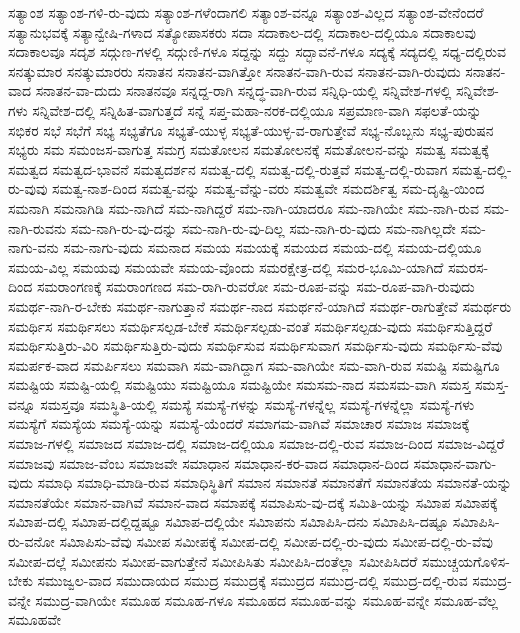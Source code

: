 {ಸತ್ಯಾಂಶ
ಸತ್ಯಾಂಶ-ಗಳಿ-ರು-ವುದು
ಸತ್ಯಾಂಶ-ಗಳೆಂದಾಗಲಿ
ಸತ್ಯಾಂಶ-ವನ್ನೂ
ಸತ್ಯಾಂಶ-ವಿಲ್ಲದ
ಸತ್ಯಾಂಶ-ವೇನೆಂದರೆ
ಸತ್ಯಾನುಭವಕ್ಕೆ
ಸತ್ಯಾನ್ವೇಷಿ-ಗಳಾದ
ಸತ್ಯೋಪಾಸಕರು
ಸದಾ
ಸದಾಕಾಲ-ದಲ್ಲಿ
ಸದಾಕಾಲ-ದಲ್ಲಿಯೂ
ಸದಾಕಾಲವು
ಸದಾಕಾಲವೂ
ಸದೃಶ
ಸದ್ಗುಣ-ಗಳಲ್ಲಿ
ಸದ್ಗುಣಿ-ಗಳೂ
ಸದ್ದನ್ನು
ಸದ್ದು
ಸದ್ಭಾವನೆ-ಗಳೂ
ಸದ್ಯಕ್ಕೆ
ಸದ್ಯದಲ್ಲಿ
ಸಧ್ಯ-ದಲ್ಲಿರುವ
ಸನತ್ಕುಮಾರ
ಸನತ್ಕುಮಾರರು
ಸನಾತನ
ಸನಾತನ-ವಾಗಿತ್ತೋ
ಸನಾತನ-ವಾಗಿ-ರುವ
ಸನಾತನ-ವಾಗಿ-ರುವುದು
ಸನಾತನ-ವಾದ
ಸನಾತನ-ವಾ-ದುದು
ಸನಾತನವೂ
ಸನ್ನದ್ದ-ರಾಗಿ
ಸನ್ನದ್ಧ-ವಾಗಿ-ರುವ
ಸನ್ನಿಧಿ-ಯಲ್ಲಿ
ಸನ್ನಿವೇಶ-ಗಳಲ್ಲಿ
ಸನ್ನಿವೇಶ-ಗಳು
ಸನ್ನಿವೇಶ-ದಲ್ಲಿ
ಸನ್ನಿಹಿತ-ವಾಗುತ್ತದೆ
ಸನ್ನೆ
ಸಪ್ತ-ಮಹಾ-ನರಕ-ದಲ್ಲಿಯೂ
ಸಪ್ರಮಾಣ-ವಾಗಿ
ಸಫಲತೆ-ಯನ್ನು
ಸಭಿಕರ
ಸಭೆ
ಸಭೆಗೆ
ಸಭ್ಯ
ಸಭ್ಯತೆಗೂ
ಸಭ್ಯತೆ-ಯುಳ್ಳ
ಸಭ್ಯತೆ-ಯುಳ್ಳ-ವ-ರಾಗುತ್ತೇವೆ
ಸಭ್ಯ-ನೊಬ್ಬನು
ಸಭ್ಯ-ಪುರುಷನ
ಸಭ್ಯರು
ಸಮ
ಸಮಂಜಸ-ವಾಗುತ್ತ
ಸಮಗ್ರ
ಸಮತೋಲನ
ಸಮತೋಲನಕ್ಕೆ
ಸಮತೋಲನ-ವನ್ನು
ಸಮತ್ವ
ಸಮತ್ವಕ್ಕೆ
ಸಮತ್ವದ
ಸಮತ್ವದ-ಭಾವನೆ
ಸಮತ್ವದರ್ಶನ
ಸಮತ್ವ-ದಲ್ಲಿ
ಸಮತ್ವ-ದಲ್ಲಿ-ರುತ್ತವೆ
ಸಮತ್ವ-ದಲ್ಲಿ-ರುವಾಗ
ಸಮತ್ವ-ದಲ್ಲಿ-ರು-ವುವು
ಸಮತ್ವ-ನಾಶ-ದಿಂದ
ಸಮತ್ವ-ವನ್ನು
ಸಮತ್ವ-ವೆನ್ನು-ವರು
ಸಮತ್ವವೇ
ಸಮದರ್ಶಿತ್ವ
ಸಮ-ದೃಷ್ಟಿ-ಯಿಂದ
ಸಮನಾಗಿ
ಸಮನಾಗಿಡಿ
ಸಮ-ನಾಗಿದೆ
ಸಮ-ನಾಗಿದ್ದರೆ
ಸಮ-ನಾಗಿ-ಯಾದರೂ
ಸಮ-ನಾಗಿಯೇ
ಸಮ-ನಾಗಿ-ರುವ
ಸಮ-ನಾಗಿ-ರುವನು
ಸಮ-ನಾಗಿ-ರು-ವು-ದನ್ನು
ಸಮ-ನಾಗಿ-ರು-ವು-ದಿಲ್ಲ
ಸಮ-ನಾಗಿ-ರು-ವುದು
ಸಮ-ನಾಗಿಲ್ಲದೇ
ಸಮ-ನಾಗು-ವನು
ಸಮ-ನಾಗು-ವುದು
ಸಮನಾದ
ಸಮಯ
ಸಮಯಕ್ಕೆ
ಸಮಯದ
ಸಮಯ-ದಲ್ಲಿ
ಸಮಯ-ದಲ್ಲಿಯೂ
ಸಮಯ-ವಿಲ್ಲ
ಸಮಯವು
ಸಮಯವೇ
ಸಮಯ-ವೊಂದು
ಸಮರಕ್ಷೇತ್ರ-ದಲ್ಲಿ
ಸಮರ-ಭೂಮಿ-ಯಾಗಿದೆ
ಸಮರಸ-ದಿಂದ
ಸಮರಾಂಗಣಕ್ಕೆ
ಸಮರಾಂಗಣದ
ಸಮ-ರಾಗಿ-ರುವರೋ
ಸಮ-ರೂಪ-ವನ್ನು
ಸಮ-ರೂಪ-ವಾಗಿ-ರುವುದು
ಸಮರ್ಥ-ನಾಗಿ-ರ-ಬೇಕು
ಸಮರ್ಥ-ನಾಗುತ್ತಾನೆ
ಸಮರ್ಥ-ನಾದ
ಸಮರ್ಥನೆ-ಯಾಗಿದೆ
ಸಮರ್ಥ-ರಾಗುತ್ತೇವೆ
ಸಮರ್ಥರು
ಸಮರ್ಥಿಸ
ಸಮರ್ಥಿಸಲು
ಸಮರ್ಥಿಸಲ್ಪಡ-ಬೇಕೆ
ಸಮರ್ಥಿಸಲ್ಪಡು-ವಂತೆ
ಸಮರ್ಥಿಸಲ್ಪಡು-ವುದು
ಸಮರ್ಥಿಸುತ್ತಿದ್ದರೆ
ಸಮರ್ಥಿಸುತ್ತಿರು-ವಿರಿ
ಸಮರ್ಥಿಸುತ್ತಿರು-ವುದು
ಸಮರ್ಥಿಸುವ
ಸಮರ್ಥಿಸುವಾಗ
ಸಮರ್ಥಿಸು-ವುದು
ಸಮರ್ಥಿಸು-ವೆವು
ಸಮರ್ಪಕ-ವಾದ
ಸಮರ್ಪಿಸಲು
ಸಮವಾಗಿ
ಸಮ-ವಾಗಿದ್ದಾಗ
ಸಮ-ವಾಗಿಯೇ
ಸಮ-ವಾಗಿ-ರುವ
ಸಮಷ್ಟಿ
ಸಮಷ್ಟಿಗೂ
ಸಮಷ್ಟಿಯ
ಸಮಷ್ಟಿ-ಯಲ್ಲಿ
ಸಮಷ್ಟಿಯು
ಸಮಷ್ಟಿಯೂ
ಸಮಷ್ಟಿಯೇ
ಸಮಸಮ-ನಾದ
ಸಮಸಮ-ವಾಗಿ
ಸಮಸ್ತ
ಸಮಸ್ತ-ವನ್ನೂ
ಸಮಸ್ತವೂ
ಸಮಸ್ಥಿತಿ-ಯಲ್ಲಿ
ಸಮಸ್ಯೆ
ಸಮಸ್ಯೆ-ಗಳನ್ನು
ಸಮಸ್ಯೆ-ಗಳನ್ನೆಲ್ಲ
ಸಮಸ್ಯೆ-ಗಳನ್ನೆಲ್ಲಾ
ಸಮಸ್ಯೆ-ಗಳು
ಸಮಸ್ಯೆಗೆ
ಸಮಸ್ಯೆಯ
ಸಮಸ್ಯೆ-ಯನ್ನು
ಸಮಸ್ಯೆ-ಯೆಂದರೆ
ಸಮಾಗಮ-ವಾಗಿವೆ
ಸಮಾಚಾರ
ಸಮಾಜ
ಸಮಾಜಕ್ಕೆ
ಸಮಾಜ-ಗಳಲ್ಲಿ
ಸಮಾಜದ
ಸಮಾಜ-ದಲ್ಲಿ
ಸಮಾಜ-ದಲ್ಲಿಯೂ
ಸಮಾಜ-ದಲ್ಲಿ-ರುವ
ಸಮಾಜ-ದಿಂದ
ಸಮಾಜ-ವಿದ್ದರೆ
ಸಮಾಜವು
ಸಮಾಜ-ವೆಂಬ
ಸಮಾಜವೇ
ಸಮಾಧಾನ
ಸಮಾಧಾನ-ಕರ-ವಾದ
ಸಮಾಧಾನ-ದಿಂದ
ಸಮಾಧಾನ-ವಾಗು-ವುದು
ಸಮಾಧಿ
ಸಮಾಧಿ-ಮಾಡಿ-ರುವ
ಸಮಾಧಿಸ್ಥಿತಿಗೆ
ಸಮಾನ
ಸಮಾನತೆ
ಸಮಾನತೆಗೆ
ಸಮಾನತೆಯ
ಸಮಾನತೆ-ಯನ್ನು
ಸಮಾನತೆಯೇ
ಸಮಾನ-ವಾಗಿವೆ
ಸಮಾನ-ವಾದ
ಸಮಾಪಕ್ಕೆ
ಸಮಾಪಿಸು-ವು-ದಕ್ಕೆ
ಸಮಿತಿ-ಯನ್ನು
ಸಮಿಾಪ
ಸಮಿಾಪಕ್ಕೆ
ಸಮಿಾಪ-ದಲ್ಲಿ
ಸಮಿಾಪ-ದಲ್ಲಿದ್ದಷ್ಟೂ
ಸಮಿಾಪ-ದಲ್ಲಿಯೇ
ಸಮಿಾಪನು
ಸಮಿಾಪಿಸಿ-ದನು
ಸಮಿಾಪಿಸಿ-ದಷ್ಟೂ
ಸಮಿಾಪಿಸಿ-ರು-ವನೋ
ಸಮಿಾಪಿಸು-ವೆವು
ಸಮೀಪ
ಸಮೀಪಕ್ಕೆ
ಸಮೀಪ-ದಲ್ಲಿ
ಸಮೀಪ-ದಲ್ಲಿ-ರು-ವುದು
ಸಮೀಪ-ದಲ್ಲಿ-ರು-ವೆವು
ಸಮೀಪ-ದಲ್ಲೆ
ಸಮೀಪನು
ಸಮೀಪ-ವಾಗುತ್ತೇನೆ
ಸಮೀಪಿಸಿತು
ಸಮೀಪಿಸಿ-ದಂತೆಲ್ಲಾ
ಸಮೀಪಿಸಿದರೆ
ಸಮುಚ್ಚಯಗೊಳಿಸ-ಬೇಕು
ಸಮುಜ್ವಲ-ವಾದ
ಸಮುದಾಯದ
ಸಮುದ್ರ
ಸಮುದ್ರಕ್ಕೆ
ಸಮುದ್ರದ
ಸಮುದ್ರ-ದಲ್ಲಿ
ಸಮುದ್ರ-ದಲ್ಲಿ-ರುವ
ಸಮುದ್ರ-ವನ್ನೇ
ಸಮುದ್ರ-ವಾಗಿಯೇ
ಸಮೂಹ
ಸಮೂಹ-ಗಳೂ
ಸಮೂಹದ
ಸಮೂಹ-ವನ್ನು
ಸಮೂಹ-ವನ್ನೇ
ಸಮೂಹ-ವೆಲ್ಲ
ಸಮೂಹವೇ
}

